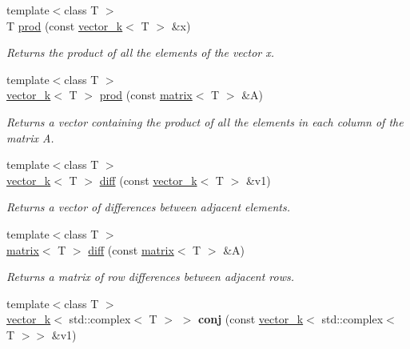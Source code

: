 \begin{DoxyCompactItemize}
\item 
\hypertarget{namespacekeycpp_add55ad2a40111d6368744a3d4144f25a}{{\footnotesize template$<$class T $>$ }\\T \hyperlink{namespacekeycpp_add55ad2a40111d6368744a3d4144f25a}{prod} (const \hyperlink{classkeycpp_1_1vector__k}{vector\-\_\-k}$<$ T $>$ \&x)}\label{namespacekeycpp_add55ad2a40111d6368744a3d4144f25a}

\begin{DoxyCompactList}\small\item\em Returns the product of all the elements of the vector x. \end{DoxyCompactList}\item 
\hypertarget{namespacekeycpp_af5471fc9074471701bde9e68eb7971b4}{{\footnotesize template$<$class T $>$ }\\\hyperlink{classkeycpp_1_1vector__k}{vector\-\_\-k}$<$ T $>$ \hyperlink{namespacekeycpp_af5471fc9074471701bde9e68eb7971b4}{prod} (const \hyperlink{classkeycpp_1_1matrix}{matrix}$<$ T $>$ \&A)}\label{namespacekeycpp_af5471fc9074471701bde9e68eb7971b4}

\begin{DoxyCompactList}\small\item\em Returns a vector containing the product of all the elements in each column of the matrix A. \end{DoxyCompactList}\item 
\hypertarget{namespacekeycpp_a52c37ec9c41349fd6bd862b8ebdd01bb}{{\footnotesize template$<$class T $>$ }\\\hyperlink{classkeycpp_1_1vector__k}{vector\-\_\-k}$<$ T $>$ \hyperlink{namespacekeycpp_a52c37ec9c41349fd6bd862b8ebdd01bb}{diff} (const \hyperlink{classkeycpp_1_1vector__k}{vector\-\_\-k}$<$ T $>$ \&v1)}\label{namespacekeycpp_a52c37ec9c41349fd6bd862b8ebdd01bb}

\begin{DoxyCompactList}\small\item\em Returns a vector of differences between adjacent elements. \end{DoxyCompactList}\item 
{\footnotesize template$<$class T $>$ }\\\hyperlink{classkeycpp_1_1matrix}{matrix}$<$ T $>$ \hyperlink{namespacekeycpp_abb4e57814fd30b7b8d4845bbc16c73e9}{diff} (const \hyperlink{classkeycpp_1_1matrix}{matrix}$<$ T $>$ \&A)
\begin{DoxyCompactList}\small\item\em Returns a matrix of row differences between adjacent rows. \end{DoxyCompactList}\item 
\hypertarget{namespacekeycpp_a436cfe206bb34dfe613ac495e792b155}{{\footnotesize template$<$class T $>$ }\\\hyperlink{classkeycpp_1_1vector__k}{vector\-\_\-k}$<$ std\-::complex$<$ T $>$ $>$ {\bfseries conj} (const \hyperlink{classkeycpp_1_1vector__k}{vector\-\_\-k}$<$ std\-::complex$<$ T $>$$>$ \&v1)}\label{namespacekeycpp_a436cfe206bb34dfe613ac495e792b155}


\end{DoxyCompactItemize}
